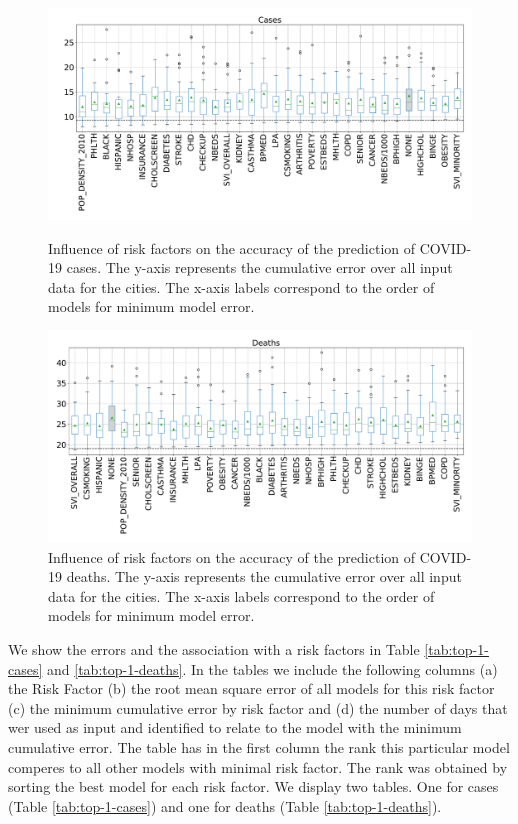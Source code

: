 \documentclass[a4paper, inpress]{jds} %
\renewcommand{\_}{%
    \textunderscore\hspace{0pt}%
}
\begin{document}
\begin{figure}[!p]
    \centering
    \includegraphics[width=1.0\textwidth]{images/boxwhisker/boxplot_casesNEW2.pdf}
    \vspace{-1cm}
    \caption{Influence of risk factors on the accuracy of the
      prediction of COVID-19 cases. The y-axis represents the
      cumulative error over all input data for the cities. The x-axis labels correspond to the order of models for minimum model error.}
    \label{fig:box-cases}
    \bigskip

    \includegraphics[width=1.0\textwidth]{images/boxwhisker/boxplot_deathNEW2.pdf}
    \vspace{-1cm}
    \caption{Influence of risk factors on the accuracy of the
      prediction of COVID-19 deaths. The y-axis represents the
      cumulative error over all input data for the cities. The x-axis labels correspond to the order of models for minimum model error.}
    \label{fig:box-death}
\end{figure}


We show the errors and the association with a risk factors in Table
 \ref{tab:top-1-cases} and \ref{tab:top-1-deaths}. In the tables we include the following columns (a) the Risk Factor (b) the root mean square error of all models for this risk factor (c) the minimum cumulative error by risk factor and (d) the number of days that wer used as input and identified to relate to the model with the minimum cumulative error. The table has in the first column the rank this particular model comperes to all other models with minimal risk factor. 
The rank was obtained by sorting the best model for each risk factor. 
We display two tables. One for cases (Table \ref{tab:top-1-cases}) and one for deaths (Table \ref{tab:top-1-deaths}).
\end{document}
